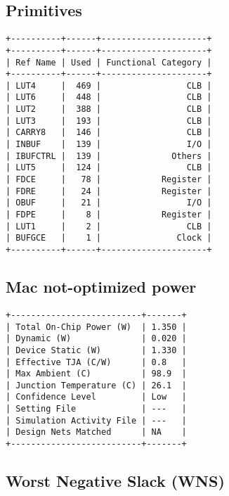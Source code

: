 \documentclass[11pt]{report}
\begin{document}
\newpage

\subsection*{Primitives}
\small
\begin{lstlisting}
+----------+------+---------------------+
+----------+------+---------------------+
| Ref Name | Used | Functional Category |
+----------+------+---------------------+
| LUT4     |  469 |                 CLB |
| LUT6     |  448 |                 CLB |
| LUT2     |  388 |                 CLB |
| LUT3     |  193 |                 CLB |
| CARRY8   |  146 |                 CLB |
| INBUF    |  139 |                 I/O |
| IBUFCTRL |  139 |              Others |
| LUT5     |  124 |                 CLB |
| FDCE     |   78 |            Register |
| FDRE     |   24 |            Register |
| OBUF     |   21 |                 I/O |
| FDPE     |    8 |            Register |
| LUT1     |    2 |                 CLB |
| BUFGCE   |    1 |               Clock |
+----------+------+---------------------+
\end{lstlisting}

\newpage


\subsection*{Mac not-optimized power}
\small
\begin{lstlisting}
+--------------------------+-------+
| Total On-Chip Power (W)  | 1.350 |
| Dynamic (W)              | 0.020 |
| Device Static (W)        | 1.330 |
| Effective TJA (C/W)      | 0.8   |
| Max Ambient (C)          | 98.9  |
| Junction Temperature (C) | 26.1  |
| Confidence Level         | Low   |
| Setting File             | ---   |
| Simulation Activity File | ---   |
| Design Nets Matched      | NA    |
+--------------------------+-------+
\end{lstlisting}


\subsection*{Worst Negative Slack (WNS)}
\end{document}
